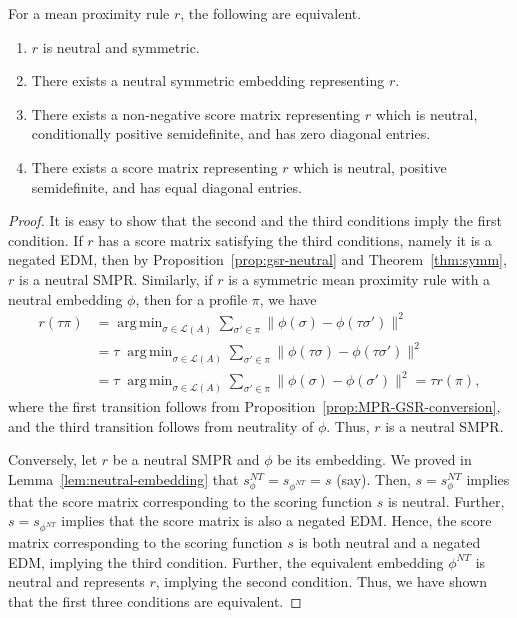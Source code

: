 \documentclass[prodmode,acmec]{ec-acmsmall}
\newcommand{\calL}{{\mathcal{L}}}
\newcommand{\rank}{{\calL(A)}}
\DeclareMathOperator*{\argmin}{arg\,min}
\newcommand{\nt}{NT}
\begin{document}
\begin{theorem}
For a mean proximity rule $r$, the following are equivalent. 
\begin{enumerate}
\item $r$ is neutral and symmetric.
\item There exists a neutral symmetric embedding representing $r$.
\item There exists a non-negative score matrix representing $r$ which is neutral, conditionally positive semidefinite, and has zero diagonal entries. 
\item There exists a score matrix representing $r$ which is neutral, positive semidefinite, and has equal diagonal entries.
\end{enumerate}
\label{thm:neutral-smpr}
\end{theorem}
\begin{proof}
It is easy to show that the second and the third conditions imply the first condition. If $r$ has a score matrix satisfying the third conditions, namely it is a negated EDM, then by Proposition~\ref{prop:gsr-neutral} and Theorem~\ref{thm:symm}, $r$ is a neutral SMPR. Similarly, if $r$ is a symmetric mean proximity rule with a neutral embedding $\phi$, then for a profile $\pi$, we have 
\begin{align*}
r(\tau \pi) &= \argmin_{\sigma \in \rank} \sum_{\sigma' \in \pi} \|\phi(\sigma)-\phi(\tau \sigma')\|^2 \\
&= \tau \; \argmin_{\sigma \in \rank} \sum_{\sigma' \in \pi} \|\phi(\tau \sigma)-\phi(\tau \sigma')\|^2 \\
&= \tau \; \argmin_{\sigma \in \rank} \sum_{\sigma' \in \pi} \|\phi(\sigma)-\phi(\sigma')\|^2 = \tau r(\pi),
\end{align*}
where the first transition follows from Proposition~\ref{prop:MPR-GSR-conversion}, and the third transition follows from neutrality of $\phi$. Thus, $r$ is a neutral SMPR. 

Conversely, let $r$ be a neutral SMPR and $\phi$ be its embedding. We proved in Lemma~\ref{lem:neutral-embedding} that $s_{\phi}^{\nt} = s_{\phi^{\nt}} = s$ (say). Then, $s = s_{\phi}^{\nt}$ implies that the score matrix corresponding to the scoring function $s$ is neutral. Further, $s = s_{\phi^{\nt}}$ implies that the score matrix is also a negated EDM. Hence, the score matrix corresponding to the scoring function $s$ is both neutral and a negated EDM, implying the third condition. Further, the equivalent embedding $\phi^{\nt}$ is neutral and represents $r$, implying the second condition. Thus, we have shown that the first three conditions are equivalent. 


\end{proof}
\end{document}
